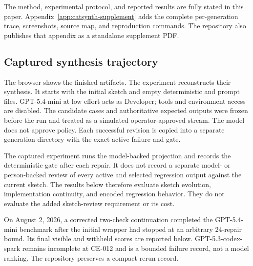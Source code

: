\documentclass[11pt]{article}
\begin{document}
The method, experimental protocol, and reported results are fully stated in this paper.
Appendix~\ref{app:catsynth-supplement} adds the complete per-generation trace, screenshots,
source map, and reproduction commands.  The repository also publishes that appendix as a
standalone supplement PDF.

\subsection{Captured synthesis trajectory}

The browser shows the finished artifacts.  The experiment reconstructs their synthesis.  It
starts with the initial sketch and empty deterministic and prompt files.  GPT-5.4-mini at low
effort acts as Developer; tools and environment access are disabled.  The candidate cases and
authoritative expected outputs were frozen before the run and treated as a simulated
operator-approved stream.  The model does not approve policy.  Each successful revision is copied into
a separate generation directory with the exact active failure and gate.

The captured experiment runs the model-backed projection and records the deterministic gate after
each repair.  It does not record a separate model- or person-backed review of every active and
selected regression output against the current sketch.  The results below therefore evaluate
sketch evolution, implementation continuity, and encoded regression behavior.  They do not
evaluate the added sketch-review requirement or its cost.

On August 2, 2026, a corrected two-check continuation completed the GPT-5.4-mini benchmark after
the initial wrapper had stopped at an arbitrary 24-repair bound.  Its final visible and withheld
scores are reported below.  GPT-5.3-codex-spark remains incomplete at CE-012 and is a bounded
failure record, not a model ranking.  The repository preserves a compact rerun record.
\end{document}
